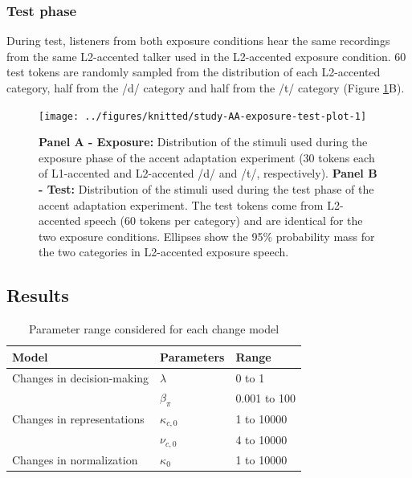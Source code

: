 \documentclass[
  11pt,
  man,floatsintext]{apa6}
\begin{document}
\hypertarget{test-phase-1}{%
\subsubsection{Test phase}\label{test-phase-1}}

During test, listeners from both exposure conditions hear the same recordings from the same L2-accented talker used in the L2-accented exposure condition. 60 test tokens are randomly sampled from the distribution of each L2-accented category, half from the /d/ category and half from the /t/ category (Figure \ref{fig:study-AA-exposure-test-plot}B).



\begin{figure}

{\centering \texttt{[image: ../figures/knitted/study-AA-exposure-test-plot-1]} 

}

\caption{\textbf{Panel A - Exposure:} Distribution of the stimuli used during the exposure phase of the accent adaptation experiment (30 tokens each of L1-accented and L2-accented /d/ and /t/, respectively). \textbf{Panel B - Test:} Distribution of the stimuli used during the test phase of the accent adaptation experiment. The test tokens come from L2-accented speech (60 tokens per category) and are identical for the two exposure conditions. Ellipses show the 95\% probability mass for the two categories in L2-accented exposure speech.}\label{fig:study-AA-exposure-test-plot}
\end{figure}

\hypertarget{results-1}{%
\subsection{Results}\label{results-1}}

\begin{table}

\caption{\label{tab:AA-table-models-parameter-setting}Parameter range considered for each change model}
\centering
\begin{tabular}[t]{lll}
\toprule
Model & Parameters & Range\\
\midrule
Changes in decision-making & $\lambda$ & 0 to 1\\
\cmidrule{1-3}
 & $\beta_\pi$ & 0.001 to 100\\
\cmidrule{1-3}
Changes in representations & $\kappa_{c,0}$ & 1 to 10000\\
\cmidrule{1-3}
 & $\nu_{c,0}$ & 4 to 10000\\
\cmidrule{1-3}
Changes in normalization & $\kappa_0$ & 1 to 10000\\
\bottomrule
\end{tabular}
\end{table}
\end{document}
